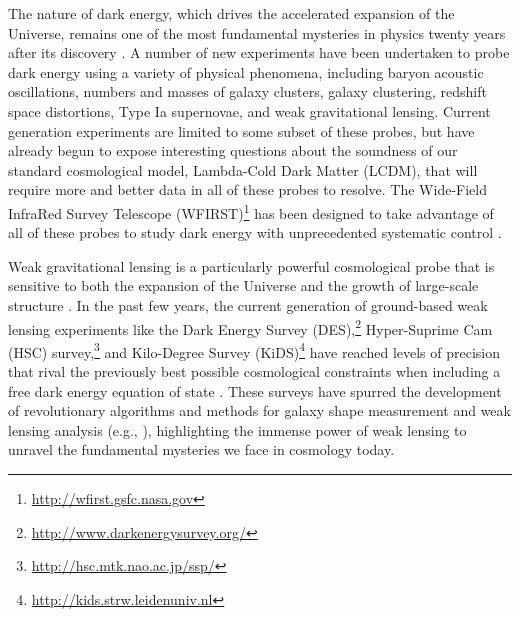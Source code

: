 \documentclass[usenatbib]{mnras}
\begin{document}
The nature of dark energy, which drives the accelerated expansion of the Universe, remains one of the most fundamental mysteries in physics twenty years after its discovery \citep{riess98,perlmutter99,detf,Frieman:2008sn,weinberg13}. 
A number of new experiments have been undertaken to probe dark energy using a variety of physical phenomena, including baryon acoustic oscillations, numbers and masses of galaxy clusters, galaxy clustering, redshift space distortions, Type Ia supernovae, and weak gravitational lensing. 
Current generation experiments are limited to some subset of these probes, but have already begun to expose interesting questions about the soundness of our standard cosmological model, Lambda-Cold Dark Matter (LCDM), that will require more and better data in all of these probes to resolve. 
The Wide-Field InfraRed Survey Telescope (WFIRST)\footnote{\url{http://wfirst.gsfc.nasa.gov}} has been designed to take advantage of all of these probes to study dark energy with unprecedented systematic control \citep{2015arXiv150303757S,2019arXiv190205569A,2019BAAS...51c.341D}.

Weak gravitational lensing is a particularly powerful cosmological probe that is sensitive to both the expansion of the Universe and the growth of large-scale structure \citep{2001PhR...340..291B,2017arXiv171003235M}. 
In the past few years, the current generation of ground-based weak lensing experiments like the Dark Energy Survey (DES),\footnote{\url{http://www.darkenergysurvey.org/}} Hyper-Suprime Cam (HSC) survey,\footnote{\url{http://hsc.mtk.nao.ac.jp/ssp/}} and Kilo-Degree Survey (KiDS)\footnote{\url{http://kids.strw.leidenuniv.nl}} have reached levels of precision that rival the previously best possible cosmological constraints when including a free dark energy equation of state \citep{2018arXiv181206076H,2018PhRvD..98d3528T,2019PhRvL.122q1301A,2019PASJ...71...43H}. 
These surveys have spurred the development of revolutionary algorithms and methods for galaxy shape measurement and weak lensing analysis (e.g., \citealt{HuffMandelbaum2017,SheldonHuff2017,shearcat}), highlighting the immense power of weak lensing to unravel the fundamental mysteries we face in cosmology today. 
\end{document}
